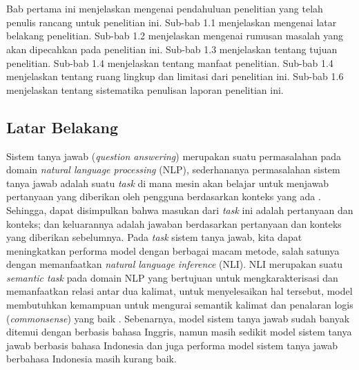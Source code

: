 \chapter{\babSatu}
\label{bab:1}
Bab pertama ini menjelaskan mengenai pendahuluan penelitian yang telah penulis rancang untuk penelitian ini. Sub-bab 1.1 menjelaskan mengenai latar belakang penelitian. Sub-bab 1.2 menjelaskan mengenai rumusan masalah yang akan dipecahkan pada penelitian ini. Sub-bab 1.3 menjelaskan tentang tujuan penelitian. Sub-bab 1.4 menjelaskan tentang manfaat penelitian. Sub-bab 1.4 menjelaskan tentang ruang lingkup dan limitasi dari penelitian ini. Sub-bab 1.6 menjelaskan tentang sistematika penulisan laporan penelitian ini.

\section{Latar Belakang}
Sistem tanya jawab (\emph{question answering}) merupakan suatu permasalahan pada domain \emph{natural language processing} (NLP), sederhananya permasalahan sistem tanya jawab adalah suatu \emph{task} di mana mesin akan belajar untuk menjawab pertanyaan yang diberikan oleh pengguna berdasarkan konteks yang ada \citep{stroh2016question}. Sehingga, dapat disimpulkan bahwa masukan dari \emph{task} ini adalah pertanyaan dan konteks; dan keluarannya adalah jawaban berdasarkan pertanyaan dan konteks yang diberikan sebelumnya. Pada \emph{task} sistem tanya jawab, kita dapat meningkatkan performa model dengan berbagai macam metode, salah satunya dengan memanfaatkan \emph{natural language inference} (NLI). NLI merupakan suatu \emph{semantic task} pada domain NLP yang bertujuan untuk mengkarakterisasi dan memanfaatkan relasi antar dua kalimat, untuk menyelesaikan hal tersebut, model membutuhkan kemampuan untuk mengurai semantik kalimat dan penalaran logis (\emph{commonsense}) yang baik \citep{bowman-etal-2015-large}. Sebenarnya, model sistem tanya jawab sudah banyak ditemui dengan berbasis bahasa Inggris, namun masih sedikit model sistem tanya jawab berbasis bahasa Indonesia dan juga performa model sistem tanya jawab berbahasa Indonesia masih kurang baik.

